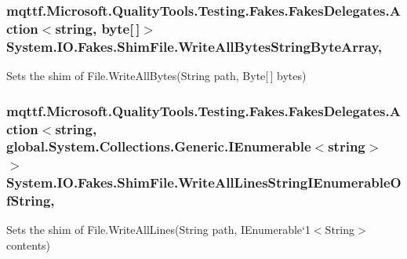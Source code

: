 \hypertarget{class_system_1_1_i_o_1_1_fakes_1_1_shim_file_ab395f40c45c2c9bef3787c10306c5324}{
\subsubsection[{Write\-All\-Bytes\-String\-Byte\-Array}]{\setlength{\rightskip}{0pt plus 5cm}mqttf.\-Microsoft.\-Quality\-Tools.\-Testing.\-Fakes.\-Fakes\-Delegates.\-Action$<$string, byte\mbox{[}$\,$\mbox{]}$>$ System.\-I\-O.\-Fakes.\-Shim\-File.\-Write\-All\-Bytes\-String\-Byte\-Array\hspace{0.3cm}{\ttfamily [static]}, {\ttfamily [set]}}}\label{class_system_1_1_i_o_1_1_fakes_1_1_shim_file_ab395f40c45c2c9bef3787c10306c5324}


Sets the shim of File.\-Write\-All\-Bytes(\-String path, Byte\mbox{[}$\,$\mbox{]} bytes)

\hypertarget{class_system_1_1_i_o_1_1_fakes_1_1_shim_file_a8ed5d9c074faed8c6b4b96115178cefb}{
\subsubsection[{Write\-All\-Lines\-String\-I\-Enumerable\-Of\-String}]{\setlength{\rightskip}{0pt plus 5cm}mqttf.\-Microsoft.\-Quality\-Tools.\-Testing.\-Fakes.\-Fakes\-Delegates.\-Action$<$string, global.\-System.\-Collections.\-Generic.\-I\-Enumerable$<$string$>$ $>$ System.\-I\-O.\-Fakes.\-Shim\-File.\-Write\-All\-Lines\-String\-I\-Enumerable\-Of\-String\hspace{0.3cm}{\ttfamily [static]}, {\ttfamily [set]}}}\label{class_system_1_1_i_o_1_1_fakes_1_1_shim_file_a8ed5d9c074faed8c6b4b96115178cefb}


Sets the shim of File.\-Write\-All\-Lines(String path, I\-Enumerable`1$<$String$>$ contents)

